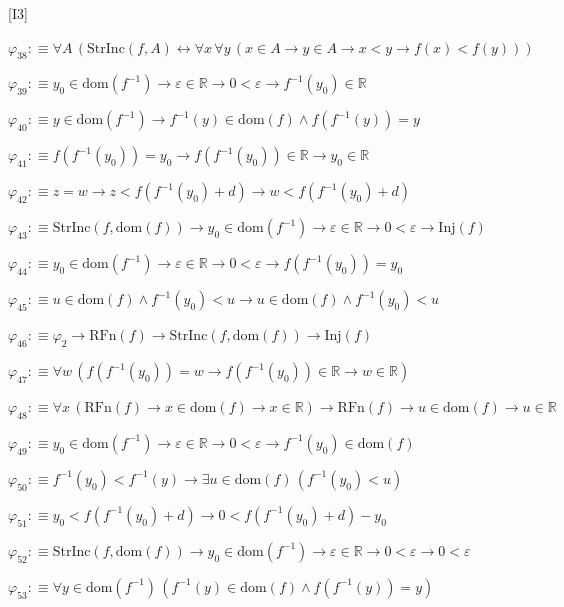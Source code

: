 \begin{fullproof}{[I3]}
\begin{abbrevlist}
\item $\varphi_{38} :\equiv \forall A\,(\mathrm{StrInc}(f,A) \leftrightarrow \forall x\,\forall y\,(x \in A \to y \in A \to x < y \to f(x) < f(y)))$
\item $\varphi_{39} :\equiv y_{0} \in \mathrm{dom}(f^{-1}) \to \varepsilon \in \mathbb{R} \to 0 < \varepsilon \to f^{-1}(y_{0}) \in \mathbb{R}$
\item $\varphi_{40} :\equiv y \in \mathrm{dom}(f^{-1}) \to f^{-1}(y) \in \mathrm{dom}(f) \land f(f^{-1}(y)) = y$
\item $\varphi_{41} :\equiv f(f^{-1}(y_{0})) = y_{0} \to f(f^{-1}(y_{0})) \in \mathbb{R} \to y_{0} \in \mathbb{R}$
\item $\varphi_{42} :\equiv z = w \to z < f(f^{-1}(y_{0}) + d) \to w < f(f^{-1}(y_{0}) + d)$
\item $\varphi_{43} :\equiv \mathrm{StrInc}(f,\mathrm{dom}(f)) \to y_{0} \in \mathrm{dom}(f^{-1}) \to \varepsilon \in \mathbb{R} \to 0 < \varepsilon \to \mathrm{Inj}(f)$
\item $\varphi_{44} :\equiv y_{0} \in \mathrm{dom}(f^{-1}) \to \varepsilon \in \mathbb{R} \to 0 < \varepsilon \to f(f^{-1}(y_{0})) = y_{0}$
\item $\varphi_{45} :\equiv u \in \mathrm{dom}(f) \land f^{-1}(y_{0}) < u \to u \in \mathrm{dom}(f) \land f^{-1}(y_{0}) < u$
\item $\varphi_{46} :\equiv \varphi_{2} \to \mathrm{RFn}(f) \to \mathrm{StrInc}(f,\mathrm{dom}(f)) \to \mathrm{Inj}(f)$
\item $\varphi_{47} :\equiv \forall w\,(f(f^{-1}(y_{0})) = w \to f(f^{-1}(y_{0})) \in \mathbb{R} \to w \in \mathbb{R})$
\item $\varphi_{48} :\equiv \forall x\,(\mathrm{RFn}(f) \to x \in \mathrm{dom}(f) \to x \in \mathbb{R}) \to \mathrm{RFn}(f) \to u \in \mathrm{dom}(f) \to u \in \mathbb{R}$
\item $\varphi_{49} :\equiv y_{0} \in \mathrm{dom}(f^{-1}) \to \varepsilon \in \mathbb{R} \to 0 < \varepsilon \to f^{-1}(y_{0}) \in \mathrm{dom}(f)$
\item $\varphi_{50} :\equiv f^{-1}(y_{0}) < f^{-1}(y) \to \exists u \in \mathrm{dom}(f)\,(f^{-1}(y_{0}) < u)$
\item $\varphi_{51} :\equiv y_{0} < f(f^{-1}(y_{0}) + d) \to 0 < f(f^{-1}(y_{0}) + d) - y_{0}$
\item $\varphi_{52} :\equiv \mathrm{StrInc}(f,\mathrm{dom}(f)) \to y_{0} \in \mathrm{dom}(f^{-1}) \to \varepsilon \in \mathbb{R} \to 0 < \varepsilon \to 0 < \varepsilon$
\item $\varphi_{53} :\equiv \forall y \in \mathrm{dom}(f^{-1})\,(f^{-1}(y) \in \mathrm{dom}(f) \land f(f^{-1}(y)) = y)$

\end{abbrevlist}
\end{fullproof}
